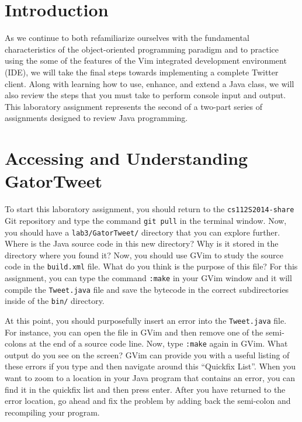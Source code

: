 


\usepackage[compact]{titlesec}



\section*{Introduction}

As we continue to both refamiliarize ourselves with the fundamental characteristics of the object-oriented programming paradigm
and to practice using the some of the features of the Vim integrated development environment (IDE), we will take the final steps
towards implementing a complete Twitter client.  Along with learning how to use, enhance, and extend a Java class, we will also
review the steps that you must take to perform console input and output. This laboratory assignment represents the second of a
two-part series of assignments designed to review Java programming.

\section*{Accessing and Understanding GatorTweet}

To start this laboratory assignment, you should return to the {\tt cs112S2014-share} Git repository and type the command {\tt git
pull} in the terminal window.  Now, you should have a {\tt lab3/GatorTweet/} directory that you can explore further.  Where is the
Java source code in this new directory? Why is it stored in the directory where you found it? Now, you should use GVim to study
the source code in the {\tt build.xml} file.  What do you think is the purpose of this file? For this assignment, you can type the
command {\tt :make} in your GVim window and it will compile the {\tt Tweet.java} file and save the bytecode in the correct
subdirectories inside of the {\tt bin/} directory. 

At this point, you should purposefully insert an error into the {\tt Tweet.java} file.  For instance, you can open the file in
GVim and then remove one of the semi-colons at the end of a source code line. Now, type {\tt :make} again in GVim.  What output do
you see on the screen? GVim can provide you with a useful listing of these errors if you type {\tt <,q>} and then navigate around this
``Quickfix List''. When you want to zoom to a location in your Java program that contains an error, you can find it in the
quickfix list and then press enter.  After you have returned to the error location, go ahead and fix the problem by adding back
the semi-colon and recompiling your program. 

